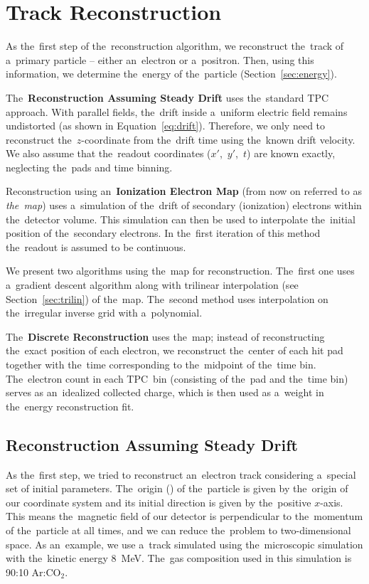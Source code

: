 \chapter{Track Reconstruction}
\label{sec:track}
	As the~first step of the~reconstruction algorithm, we reconstruct the~track of a~primary particle -- either an~electron or a~positron. Then, using this information, we determine the~energy of the~particle (Section~\ref{sec:energy}).
	
	The~\textbf{Reconstruction Assuming Steady Drift} uses the~standard \ac{TPC} approach. With parallel fields, the~drift inside a~uniform electric field remains undistorted (as shown in Equation~\ref{eq:drift}). Therefore, we only need to reconstruct the~$z$\nobreakdash-coordinate from the~drift time using the~known drift velocity. We also assume that the~readout coordinates ($x'$,~$y'$,~$t$) are known exactly, neglecting the~pads and time binning.
	
	Reconstruction using an~\textbf{Ionization Electron Map} (from now on referred to as \emph{the~map}) uses a~simulation of the~drift of secondary (ionization) electrons within the~detector volume. This simulation can then be used to interpolate the~initial position of the~secondary electrons. In the~first iteration of this method the~readout is assumed to be continuous.
	
	We present two algorithms using the~map for reconstruction. The~first one uses a~gradient descent algorithm along with trilinear interpolation (see Section~\ref{sec:trilin}) of the~map. The~second method uses interpolation on the~irregular inverse grid with a~polynomial.
	
	The~\textbf{Discrete Reconstruction} uses the~map; instead of reconstructing the~exact position of each electron, we reconstruct the~center of each hit pad together with the~time corresponding to the~midpoint of the~time bin. The~electron count in each \ac{TPC}~bin (consisting of the~pad and the~time bin) serves as an~idealized collected charge, which is then used as a~weight in the~energy reconstruction fit.
	
	\section{Reconstruction Assuming Steady Drift}
	\label{sec:trackfirst}
		As the~first step, we tried to reconstruct an~electron track considering a~special set of initial parameters. The~origin () of the~particle is given by the~origin of our coordinate system and its initial direction is given by the~positive $x$\nobreakdash-axis. This means the~magnetic field of our detector is perpendicular to the~momentum of the~particle at all times, and we can reduce the~problem to two-dimensional space. As an~example, we use a~track simulated using the~microscopic simulation with the~kinetic energy 8~MeV. The~gas composition used in this simulation is 90:10 Ar:CO$_2$. 
		
